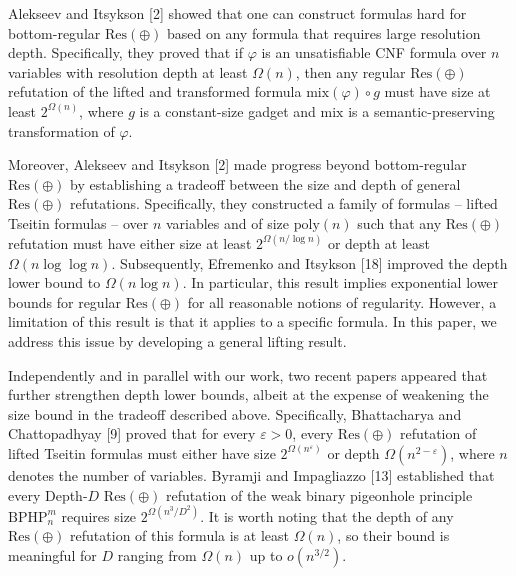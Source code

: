 \documentclass[10pt,a4paper]{article}
\begin{document}
Alekseev and Itsykson [2] showed that one can construct formulas hard for bottom-regular
$\mathrm{Res}(\oplus)$ based on any formula that requires large resolution depth.
Specifically, they proved that if $\varphi$ is an unsatisfiable CNF formula over $n$ variables
with resolution depth at least $\Omega(n)$, then any regular $\mathrm{Res}(\oplus)$ refutation of the
lifted and transformed formula $\mathrm{mix}(\varphi)\circ g$ must have size at least $2^{\Omega(n)}$,
where $g$ is a constant-size gadget and $\mathrm{mix}$ is a semantic-preserving transformation of $\varphi$.\par



Moreover, Alekseev and Itsykson [2] made progress beyond bottom-regular $\mathrm{Res}(\oplus)$ by
establishing a tradeoff between the size and depth of general $\mathrm{Res}(\oplus)$ refutations.
Specifically, they constructed a family of formulas – lifted Tseitin formulas – over $n$ variables and of size $\mathrm{poly}(n)$
such that any $\mathrm{Res}(\oplus)$ refutation must have either size at least $2^{\Omega(n/\log n)}$ or
depth at least $\Omega(n\log\log n)$.
Subsequently, Efremenko and Itsykson [18] improved the depth lower bound to $\Omega(n\log n)$.
In particular, this result implies exponential lower bounds for regular $\mathrm{Res}(\oplus)$ for all
reasonable notions of regularity.
However, a limitation of this result is that it applies to a specific formula.
In this paper, we address this issue by developing a general lifting result.\par



Independently and in parallel with our work, two recent papers appeared that further strengthen depth lower bounds, albeit at the expense of weakening the size bound in the tradeoff described above. Specifically, Bhattacharya and Chattopadhyay [9] proved that for every $\varepsilon>0$, every $\mathrm{Res}(\oplus)$ refutation of lifted Tseitin formulas must either have size $2^{\Omega(n^{\varepsilon})}$ or depth $\Omega(n^{2-\varepsilon})$, where $n$ denotes the number of variables.
Byramji and Impagliazzo [13] established that every Depth-$D$ $\mathrm{Res}(\oplus)$ refutation of the weak binary pigeonhole principle $\mathrm{BPHP}^{m}_{n}$ requires size $2^{\Omega(n^{3}/D^{2})}$. It is worth noting that the depth of any $\mathrm{Res}(\oplus)$ refutation of this formula is at least $\Omega(n)$, so their bound is meaningful for $D$ ranging from $\Omega(n)$ up to $o(n^{3/2})$.\par
\end{document}
